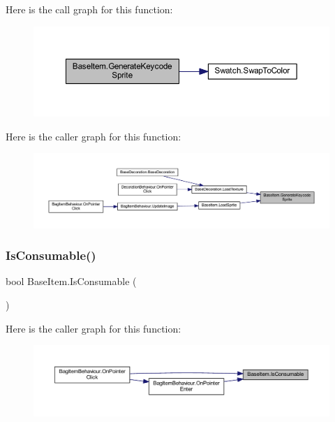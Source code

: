 Here is the call graph for this function\+:
\nopagebreak
\begin{figure}[H]
\begin{center}
\leavevmode
\includegraphics[width=350pt]{class_base_item_a0bb5888f3371b291645137272f417b30_cgraph}
\end{center}
\end{figure}
Here is the caller graph for this function\+:
\nopagebreak
\begin{figure}[H]
\begin{center}
\leavevmode
\includegraphics[width=350pt]{class_base_item_a0bb5888f3371b291645137272f417b30_icgraph}
\end{center}
\end{figure}
\mbox{\label{class_base_item_a3888fc05b9a0589c098ed9a8c2f978f2}} 
\subsubsection{\texorpdfstring{IsConsumable()}{IsConsumable()}}
{\footnotesize\ttfamily bool Base\+Item.\+Is\+Consumable (\begin{DoxyParamCaption}{ }\end{DoxyParamCaption})}

Here is the caller graph for this function\+:
\nopagebreak
\begin{figure}[H]
\begin{center}
\leavevmode
\includegraphics[width=350pt]{class_base_item_a3888fc05b9a0589c098ed9a8c2f978f2_icgraph}
\end{center}
\end{figure}
\mbox{\label{class_base_item_a251c4cb0509ed9191a07057f8ea388c6}} 
